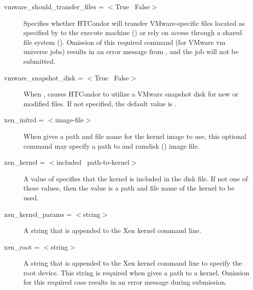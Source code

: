 \begin{description}
\label{condor-submit-vmware-should-transfer-files}
\item[vmware\_should\_transfer\_files = $<$True \Bar\ False$>$]
Specifies whether HTCondor will transfer VMware-specific files 
located as specified by  to
the execute machine () or rely on access through 
a shared file system ().
Omission of this required command (for VMware vm universe jobs)
results in an error message from , and the
job will not be submitted.


\label{condor-submit-vmware-snapshot-disk}
\item[vmware\_snapshot\_disk = $<$True \Bar\ False$>$]
When , causes HTCondor to utilize
a VMware snapshot disk for new or modified files.
If not specified, the default value is .


\label{condor-submit-xen-initrd}
\item[xen\_initrd = $<$image-file$>$]
When  gives a path and file name for
the kernel image to use, 
this optional command may specify a path to and ramdisk 
() image file.


\label{condor-submit-xen-kernel}
\item[xen\_kernel = $<$included \Bar\  path-to-kernel$>$]
A value of  specifies that the kernel is
included in the disk file.
If not one of these values, then the value is a path and
file name of the kernel to be used.


\label{condor-submit-xen-kernel-params}
\item[xen\_kernel\_params = $<$string$>$]
A string that is appended to the Xen kernel command line.


\label{condor-submit-xen-root}
\item[xen\_root = $<$string$>$]
A string that is appended to the Xen kernel command line
to specify the root device. This string is required when
 gives a path to a kernel.  Omission 
for this required case results in an error message during 
submission.

\end{description} 

